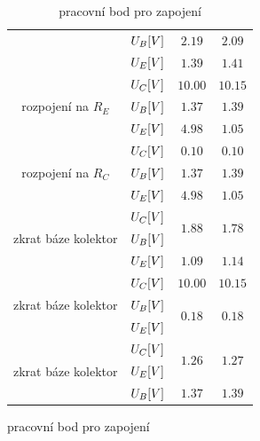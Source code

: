 \documentclass{article}
\begin{document}
\begin{figure}[H]
\begin{minipage}[t]{0.4\textwidth}
\begin{table}[H]
\begin{tabular}{|c|c|c|c|}
                                                & \(U_B\-[V]\)  & \(2.19\)                  & \(2.09\)                  \\ \cline{2-4}
                                                & \(U_E\-[V]\)  & \(1.39\)                  & \(1.41\)                  \\ \hline
      \multirow{3}{*}{rozpojení na \(R_{E}\)}   &	\(U_C\-[V]\)  & \(10.00\)                 & \(10.15\)                 \\ \cline{2-4}
                                                & \(U_B\-[V]\)  & \(1.37\)                  & \(1.39\)                  \\ \cline{2-4}
                                                & \(U_E\-[V]\)  & \(4.98\)                  & \(1.05\)                  \\ \hline
      \multirow{3}{*}{rozpojení na \(R_{C}\)}   &	\(U_C\-[V]\)  & \(0.10\)                  & \(0.10\)                  \\ \cline{2-4}
                                                & \(U_B\-[V]\)  & \(1.37\)                  & \(1.39\)                  \\ \cline{2-4}
                                                & \(U_E\-[V]\)  & \(4.98\)                  & \(1.05\)                  \\ \hline
      \multirow{3}{*}{zkrat báze kolektor}      &	\(U_C\-[V]\)  & \multirow{2}{*}{\(1.88\)} & \multirow{2}{*}{\(1.78\)} \\ \cline{2-2} 
                                                & \(U_B\-[V]\)  &                           &                           \\ \cline{2-4}
                                                & \(U_E\-[V]\)  & \(1.09\)                  & \(1.14\)                  \\ \hline
      \multirow{3}{*}{zkrat báze kolektor}      &	\(U_C\-[V]\)  & \(10.00\)                 & \(10.15\)                 \\ \cline{2-4}
                                                & \(U_B\-[V]\)  & \multirow{2}{*}{\(0.18\)} & \multirow{2}{*}{\(0.18\)} \\ \cline{2-2}
                                                & \(U_E\-[V]\)  &                           &                           \\ \hline
      \multirow{3}{*}{zkrat báze kolektor}      &	\(U_C\-[V]\)  & \multirow{2}{*}{\(1.26\)} & \multirow{2}{*}{\(1.27\)} \\ \cline{2-2}
                                                & \(U_E\-[V]\)  &                           &                           \\ \cline{2-4}
                                                & \(U_B\-[V]\)  & \(1.37\)                  & \(1.39\)                  \\ \hline
      \end{tabular}
      \caption{\label{pracovni_bod} pracovní bod pro zapojení }
    \end{table}
  \end{minipage}
\end{figure}
\end{document}
